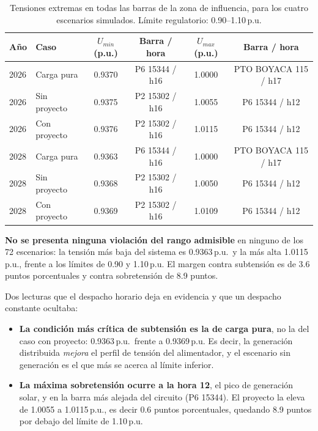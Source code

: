 \documentclass[11pt,a4paper]{article}
\begin{document}
\begin{table}[H]
\centering
\caption{Tensiones extremas en todas las barras de la zona de influencia, para los cuatro escenarios simulados. L\'imite regulatorio: 0.90--1.10\,p.u.}
\begin{tabular}{llcccc}
\toprule
A\~no & Caso & $U_{min}$ (p.u.) & Barra / hora & $U_{max}$ (p.u.) & Barra / hora \\
\midrule
2026 & Carga pura & 0.9370 & P6 15344 / h16 & 1.0000 & PTO BOYACA 115 / h17 \\
2026 & Sin proyecto & 0.9375 & P2 15302 / h16 & 1.0055 & P6 15344 / h12 \\
2026 & Con proyecto & 0.9376 & P2 15302 / h16 & 1.0115 & P6 15344 / h12 \\
2028 & Carga pura & 0.9363 & P6 15344 / h16 & 1.0000 & PTO BOYACA 115 / h17 \\
2028 & Sin proyecto & 0.9368 & P2 15302 / h16 & 1.0050 & P6 15344 / h12 \\
2028 & Con proyecto & 0.9369 & P2 15302 / h16 & 1.0109 & P6 15344 / h12 \\
\bottomrule
\end{tabular}
\end{table}

\textbf{No se presenta ninguna violaci\'on del rango admisible} en ninguno de los 72 escenarios: la tensi\'on m\'as baja del sistema es 0.9363\,p.u.\ y la m\'as alta 1.0115\,p.u., frente a los l\'imites de 0.90 y 1.10\,p.u. El margen contra subtensi\'on es de 3.6 puntos porcentuales y contra sobretensi\'on de 8.9 puntos.

Dos lecturas que el despacho horario deja en evidencia y que un despacho constante ocultaba:

\begin{itemize}
\item \textbf{La condici\'on m\'as cr\'itica de subtensi\'on es la de carga pura}, no la del caso con proyecto: 0.9363\,p.u.\ frente a 0.9369\,p.u. Es decir, la generaci\'on distribuida \emph{mejora} el perfil de tensi\'on del alimentador, y el escenario sin generaci\'on es el que m\'as se acerca al l\'imite inferior.
\item \textbf{La m\'axima sobretensi\'on ocurre a la hora 12}, el pico de generaci\'on solar, y en la barra m\'as alejada del circuito (P6 15344). El proyecto la eleva de 1.0055 a 1.0115\,p.u., es decir 0.6 puntos porcentuales, quedando 8.9 puntos por debajo del l\'imite de 1.10\,p.u.
\end{itemize}
\end{document}
